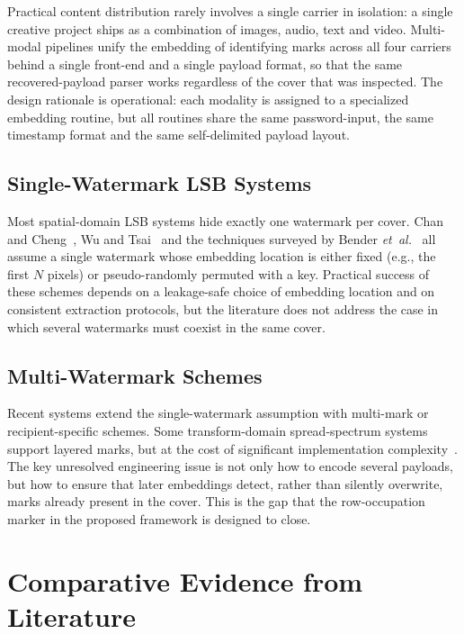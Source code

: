 Practical content distribution rarely involves a single carrier in isolation: a single creative project ships as a combination of images, audio, text and video. Multi-modal pipelines unify the embedding of identifying marks across all four carriers behind a single front-end and a single payload format, so that the same recovered-payload parser works regardless of the cover that was inspected. The design rationale is operational: each modality is assigned to a specialized embedding routine, but all routines share the same password-input, the same timestamp format and the same self-delimited payload layout.

\subsection{Single-Watermark LSB Systems}

Most spatial-domain LSB systems hide exactly one watermark per cover. Chan and Cheng~\cite{chan2004hiding}, Wu and Tsai~\cite{wu2003steganography} and the techniques surveyed by Bender \emph{et~al.}~\cite{bender1996techniques} all assume a single watermark whose embedding location is either fixed (e.g., the first $N$ pixels) or pseudo-randomly permuted with a key. Practical success of these schemes depends on a leakage-safe choice of embedding location and on consistent extraction protocols, but the literature does not address the case in which several watermarks must coexist in the same cover.

\subsection{Multi-Watermark Schemes}

Recent systems extend the single-watermark assumption with multi-mark or recipient-specific schemes. Some transform-domain spread-spectrum systems support layered marks, but at the cost of significant implementation complexity~\cite{cox1997secure,podilchuk2001digital}. The key unresolved engineering issue is not only how to encode several payloads, but how to ensure that later embeddings detect, rather than silently overwrite, marks already present in the cover. This is the gap that the row-occupation marker in the proposed framework is designed to close.

\section{Comparative Evidence from Literature}

